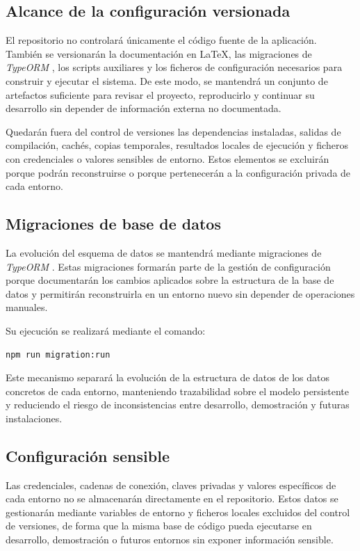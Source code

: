 \subsection{Alcance de la configuración versionada}

El repositorio no controlará únicamente el código fuente de la aplicación. También se versionarán la documentación en \LaTeX{}, las migraciones de \textit{TypeORM} \citep{typeormmigrations2026}, los scripts auxiliares y los ficheros de configuración necesarios para construir y ejecutar el sistema. De este modo, se mantendrá un conjunto de artefactos suficiente para revisar el proyecto, reproducirlo y continuar su desarrollo sin depender de información externa no documentada.

Quedarán fuera del control de versiones las dependencias instaladas, salidas de compilación, cachés, copias temporales, resultados locales de ejecución y ficheros con credenciales o valores sensibles de entorno. Estos elementos se excluirán porque podrán reconstruirse o porque pertenecerán a la configuración privada de cada entorno.

\subsection{Migraciones de base de datos}

La evolución del esquema de datos se mantendrá mediante migraciones de \textit{TypeORM} \citep{typeormmigrations2026}. Estas migraciones formarán parte de la gestión de configuración porque documentarán los cambios aplicados sobre la estructura de la base de datos y permitirán reconstruirla en un entorno nuevo sin depender de operaciones manuales.

Su ejecución se realizará mediante el comando:

\begin{lstlisting}[language=bash]
npm run migration:run
\end{lstlisting}

Este mecanismo separará la evolución de la estructura de datos de los datos concretos de cada entorno, manteniendo trazabilidad sobre el modelo persistente y reduciendo el riesgo de inconsistencias entre desarrollo, demostración y futuras instalaciones.

\subsection{Configuración sensible}

Las credenciales, cadenas de conexión, claves privadas y valores específicos de cada entorno no se almacenarán directamente en el repositorio. Estos datos se gestionarán mediante variables de entorno y ficheros locales excluidos del control de versiones, de forma que la misma base de código pueda ejecutarse en desarrollo, demostración o futuros entornos sin exponer información sensible.

